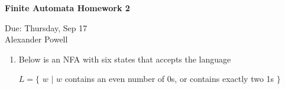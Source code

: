 \documentclass[11pt]{article}
\begin{document}
\begin{center}             %
\begin{LARGE}
{\bf Finite Automata Homework 2}
\end{LARGE}
\vskip 0.25cm      %

Due: Thursday, Sep 17\\  %
Alexander Powell
\end{center}

\begin{enumerate}

\item Below is an NFA with six states that accepts the language 

$ L = \{$ $w$ $|$ $w$ contains an even number of 0s, or contains exactly two 1s $\} $


\end{enumerate}
\end{document}
